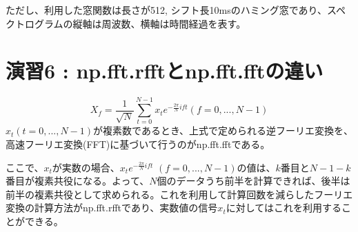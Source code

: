 \documentclass[a4paper,11pt]{jsarticle}
\begin{document}
ただし、利用した窓関数は長さが512, シフト長10msのハミング窓であり、スペクトログラムの縦軸は周波数、横軸は時間経過を表す。

\section{演習6 : np.fft.rfftとnp.fft.fftの違い}
$$
X_f = \frac{1}{\sqrt{N}} \sum_{t=0}^{N-1} x_t e^{-\frac{2\pi}{N}ift}  (f=0,...,N-1)
$$
$x_t (t=0,...,N-1)$が複素数であるとき、上式で定められる逆フーリエ変換を、高速フーリエ変換(FFT)に基づいて行うのがnp.fft.fftである。\par
ここで、$x_t$が実数の場合、$x_t e^{-\frac{2\pi}{N}ift}$ $(f=0,...,N-1)$の値は、$k$番目と$N-1-k$番目が複素共役になる。よって、$N$個のデータうち前半を計算できれば、後半は前半の複素共役として求められる。これを利用して計算回数を減らしたフーリエ変換の計算方法がnp.fft.rfftであり、実数値の信号$x_t$に対してはこれを利用することができる。
\end{document}
